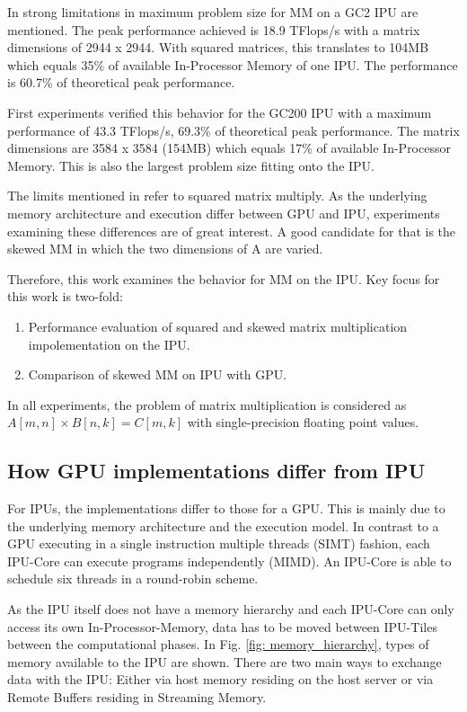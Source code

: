 \documentclass[a4paper,UKenglish,cleveref, autoref, thm-restate]{oasics-v2021}
\begin{document}
In \cite{IPUDiss} strong limitations in maximum problem size for MM on a GC2 IPU are mentioned. The peak performance achieved is 18.9 TFlops/s with a matrix dimensions of 2944 x 2944. With squared matrices, this translates to 104MB which equals 35\% of available In-Processor Memory of one IPU. The performance is 60.7\% of theoretical peak performance.

First experiments verified this behavior for the GC200 IPU with a maximum performance of 43.3 TFlops/s, 69.3\% of theoretical peak performance. The matrix dimensions are 3584 x 3584 (154MB) which equals 17\% of available In-Processor Memory. This is also the largest problem size fitting onto the IPU.

The limits mentioned in \cite{IPUDiss} refer to squared matrix multiply. As the underlying memory architecture and execution differ between GPU and IPU, experiments examining these differences are of great interest. A good candidate for that is the skewed MM in which the two dimensions of A are varied.

Therefore, this work examines the behavior for MM on the IPU. Key focus for this work is two-fold:
\begin{enumerate}
	\item Performance evaluation of squared and skewed matrix multiplication impolementation on the IPU.
	\item Comparison of skewed MM on IPU with GPU.
\end{enumerate}
In all experiments, the problem of matrix multiplication is considered as $A[m,n] \times B[n,k] = C[m,k]$ with single-precision floating point values.


\subsection{How GPU implementations differ from IPU}
For IPUs, the implementations differ to those for a GPU.
This is mainly due to the underlying memory architecture and the execution model. 
In contrast to a GPU executing in a single instruction multiple threads (SIMT) fashion, each IPU-Core can execute programs independently (MIMD). An IPU-Core is able to schedule six threads in a round-robin scheme. 

As the IPU itself does not have a memory hierarchy and each IPU-Core can only access its own In-Processor-Memory, data has to be moved between IPU-Tiles between the computational phases. In Fig. \ref{fig: memory_hierarchy}, types of memory available to the IPU are shown. There are two main ways to exchange data with the IPU: Either via host memory residing on the host server or via Remote Buffers residing in Streaming Memory.  
\end{document}
